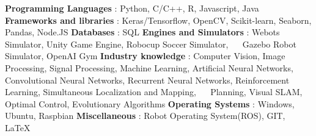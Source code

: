 \begin{cventries}  
\skillentry
    {
    \bullet \space \textbf{Programming Languages} : Python, C/C++, R, Javascript, Java \newline
    \bullet \space \textbf{Frameworks and libraries} : Keras/Tensorflow, OpenCV, Scikit-learn, Seaborn, Pandas, Node.JS \newline
    \bullet \space \textbf{Databases} : SQL \newline
    \bullet \space \textbf{Engines and Simulators} : Webots Simulator, Unity Game Engine, Robocup Soccer Simulator, \newline $\quad$ Gazebo Robot Simulator, OpenAI Gym \newline
    \bullet \space \textbf{Industry knowledge} : Computer Vision, Image Processing, Signal Processing, Machine Learning, Artificial Neural Networks, \newline $\quad$ Convolutional Neural Networks, Recurrent Neural Networks, Reinforcement Learning, Simultaneous Localization and Mapping, \newline $\quad$ Planning, Visual SLAM, Optimal Control, Evolutionary Algorithms   \newline
    \bullet \space \textbf{Operating Systems} : Windows, Ubuntu, Raspbian \newline
    \bullet \space \textbf{Miscellaneous} : Robot Operating System(ROS), GIT, LaTeX
    }
\end{cventries}
